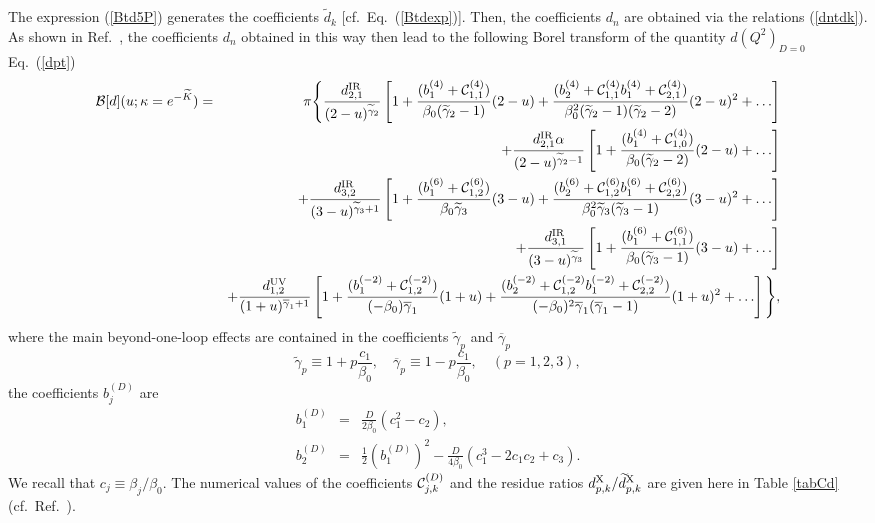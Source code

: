 \documentclass[aps,nofootinbib,showkeys,noshowpacs,preprintnumbers,amsmath,amssymb]{revtex4}
\def\be{\begin{equation}}
\def\ee{\end{equation}}
\def\bea{\begin{eqnarray}}
\def\eea{\end{eqnarray}}
\def\bes{\begin{subequations}}
\def\ees{\end{subequations}}
\newcommand{\tK}{{\widetilde K}}
\newcommand{\td}{{\widetilde d}}
\newcommand{\tg}{{\widetilde {\gamma}}}
\newcommand{\bg}{{\overline {\gamma}}}
\begin{document}
The expression (\ref{Btd5P}) generates the coefficients $\td_k$ [cf.~Eq.~(\ref{Btdexp})]. Then, the coefficients $d_n$ are obtained via the relations (\ref{dntdk}). As shown in Ref.~\cite{renmod}, the coefficients $d_n$ obtained in this way then lead to the following Borel transform of the quantity $d(Q^2)_{D=0}$ Eq.~(\ref{dpt})
\bea
{\cal B}[d](u;\kappa=e^{-\tK}) & = & \pi {\Bigg \{} \frac{d_{2,1}^{\rm IR}}{(2 - u)^{\tg_2}} \left[ 1 + \frac{(b_1^{(4)}+{\cal C}_{1,1}^{(4)})}{\beta_0 (\tg_2-1)} (2-u) + \frac{(b_2^{(4)}+{\cal C}_{1,1}^{(4)} b_1^{(4)} +{\cal C}_{2,1}^{(4)})}{ \beta_0^2 (\tg_2-1)(\tg_2-2)} (2-u)^2 + \ldots \right]
\nonumber\\ &&
+ \frac{d_{2,1}^{\rm IR} \alpha}{(2 - u)^{\tg_2-1}}  \left[ 1 + \frac{(b_1^{(4)}+{\cal C}_{1,0}^{(4)})}{\beta_0 (\tg_2-2)} (2-u) + \ldots \right]
\nonumber\\ &&
+ \frac{d_{3,2}^{\rm IR}}{(3 - u)^{\tg_3+1}} \left[ 1 + \frac{(b_1^{(6)}+{\cal C}_{1,2}^{(6)})}{\beta_0 \tg_3} (3-u) + \frac{(b_2^{(6)}+{\cal C}_{1,2}^{(6)} b_1^{(6)} +{\cal C}_{2,2}^{(6)})}{ \beta_0^2 \tg_3 (\tg_3-1)} (3 - u)^2 + \ldots \right]
\nonumber\\ &&
+ \frac{d_{3,1}^{\rm IR}}{(3 - u)^{\tg_3}} \left[ 1 + \frac{(b_1^{(6)}+{\cal C}_{1,1}^{(6)})}{\beta_0 (\tg_3-1)} (3-u) + \ldots \right]
\nonumber\\ &&
+ \frac{d_{1,2}^{\rm UV}}{(1+ u)^{\bg_1+1}} \left[ 1 + \frac{(b_1^{(-2)}+{\cal C}_{1,2}^{(-2)})}{(-\beta_0) \bg_1} (1+u) + \frac{(b_2^{(-2)}+{\cal C}_{1,2}^{(-2)} b_1^{(-2)} +{\cal C}_{2,2}^{(-2)})}{ (-\beta_0)^2 \bg_1 (\bg_1-1)} (1+ u)^2 + \ldots \right] {\Bigg \}},
\label{Bd5P}
\eea
where the main beyond-one-loop effects are contained in the coefficients $\tg_p$ and $\bg_p$
\be
\tg_p \equiv 1 + p \frac{c_1}{\beta_0}, \quad \bg_p \equiv  1 - p \frac{c_1}{\beta_0}, \quad (p=1,2,3),
\label{tgbg}
\ee
the coefficients $b_j^{(D)}$ are
\bes
\label{bjDs}
\bea
b_1^{(D)} &=& \frac{D}{2 \beta_0} ( c_1^2 - c_2),
\label{b1D}
\\
b_2^{(D)} &=& \frac{1}{2} (b_1^{(D)})^2 - \frac{D}{4 \beta_0} ( c_1^3 - 2 c_1 c_2 + c_3).
\label{b2D}
\eea
\ees
We recall that $c_j \equiv \beta_j/\beta_0$.
The numerical values of the coefficients ${\cal C}^{(D)}_{j,k}$ and the residue ratios $d^{\rm X}_{p,k}/\td^{\rm X}_{p,k}$ are given here in Table \ref{tabCd} (cf.~Ref.~\cite{renmod}).
\end{document}
